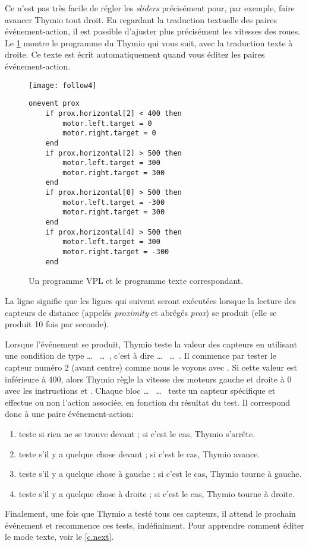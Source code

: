 
Ce n'est pas très facile de régler les \textit{sliders} précisément pour, par exemple, faire avancer Thymio tout droit.
En regardant la traduction textuelle des paires événement-action, il est possible d'ajuster plus précisément les vitesses des roues.
Le \cref{fig.textcode} montre le programme du Thymio qui vous suit, avec la traduction texte à droite.
Ce texte est écrit automatiquement quand vous éditez les paires événement-action.

\begin{figure}
\texttt{[image: follow4]}
\hfill
\begin{minipage}[b]{0.6\textwidth}
\footnotesize
\begin{lstlisting}
onevent prox
	if prox.horizontal[2] < 400 then
		motor.left.target = 0
		motor.right.target = 0
	end
	if prox.horizontal[2] > 500 then
		motor.left.target = 300
		motor.right.target = 300
	end
	if prox.horizontal[0] > 500 then
		motor.left.target = -300
		motor.right.target = 300
	end
	if prox.horizontal[4] > 500 then
		motor.left.target = 300
		motor.right.target = -300
	end
\end{lstlisting}
\end{minipage}
\caption{Un programme VPL et le programme texte correspondant.}
\label{fig.textcode}
\end{figure}

La ligne  signifie que les lignes qui suivent seront exécutées lorsque la lecture des capteurs de distance (appelés \textit{proximity} et abrégés \textit{prox}) se produit (elle se produit 10 fois par seconde).

Lorsque l'événement se produit, Thymio teste la valeur des capteurs en utilisant une condition de type  \ldots \  \ldots \ , c'est à dire  \ldots \  \ldots \ .
Il commence par tester le capteur numéro 2 (avant centre) comme nous le voyons avec .
Si cette valeur est inférieure à 400, alors Thymio règle la vitesse des moteurs gauche et droite à 0 avec les instructions  et .
Chaque bloc  \ldots \  \ldots \  teste un capteur spécifique et effectue ou non l'action associée, en fonction du résultat du test.
Il correspond donc à une paire événement-action:
\begin{enumerate}[start=0]
	\item teste si rien ne se trouve devant ; si c'est le cas, Thymio s'arrête.
	\item teste s'il y a quelque chose devant ; si c'est le cas, Thymio avance.
	\item teste s'il y a quelque chose à gauche ; si c'est le cas, Thymio tourne à gauche.
	\item teste s'il y a quelque chose à droite ; si c'est le cas, Thymio tourne à droite.
\end{enumerate}
Finalement, une fois que Thymio a testé tous ces capteurs, il attend le prochain événement  et recommence ces tests, indéfiniment.
Pour apprendre comment éditer le mode texte, voir le \cref{c.next}.

